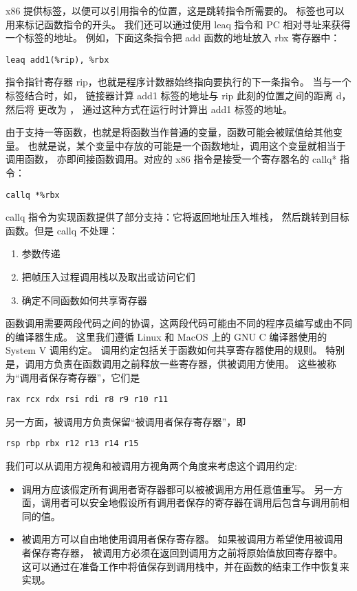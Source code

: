x86 提供标签，以便可以引用指令的位置，这是跳转指令所需要的。
标签也可以用来标记函数指令的开头。
我们还可以通过使用 leaq 指令和 PC 相对寻址来获得一个标签的地址。
例如，下面这条指令把 add 函数的地址放入 rbx 寄存器中：
\begin{lstlisting}
leaq add1(%rip), %rbx
\end{lstlisting}

指令指针寄存器 rip，也就是程序计数器始终指向要执行的下一条指令。
当与一个标签结合时，如，
链接器计算 add1 标签的地址与 rip 此刻的位置之间的距离 d，
然后将  更改为 ，
通过这种方式在运行时计算出 add1 标签的地址。

由于支持一等函数，也就是将函数当作普通的变量，函数可能会被赋值给其他变量。
也就是说，某个变量中存放的可能是一个函数地址，调用这个变量就相当于调用函数，
亦即间接函数调用。对应的 x86 指令是接受一个寄存器名的 callq* 指令：
\begin{lstlisting}
callq *%rbx
\end{lstlisting}

callq 指令为实现函数提供了部分支持：它将返回地址压入堆栈，
然后跳转到目标函数。但是 callq 不处理：
\begin{enumerate}
\item 参数传递
\item 把帧压入过程调用栈以及取出或访问它们
\item 确定不同函数如何共享寄存器
\end{enumerate}

函数调用需要两段代码之间的协调，这两段代码可能由不同的程序员编写或由不同的编译器生成。
这里我们遵循 Linux 和 MacOS 上的 GNU C 编译器使用的
System V 调用约定\cite{Matz_Hubicka_Jaeger_Mitchell_2013}。
调用约定包括关于函数如何共享寄存器使用的规则。
特别是，调用方负责在函数调用之前释放一些寄存器，供被调用方使用。
这些被称为“调用者保存寄存器”，它们是
\begin{lstlisting}
rax rcx rdx rsi rdi r8 r9 r10 r11
\end{lstlisting}
另一方面，被调用方负责保留“被调用者保存寄存器”，即
\begin{lstlisting}
rsp rbp rbx r12 r13 r14 r15
\end{lstlisting}

我们可以从调用方视角和被调用方视角两个角度来考虑这个调用约定:
\begin{itemize}
\item 调用方应该假定所有调用者寄存器都可以被被调用方用任意值重写。
另一方面，调用者可以安全地假设所有调用者保存的寄存器在调用后包含与调用前相同的值。
\item 被调用方可以自由地使用调用者保存寄存器。
如果被调用方希望使用被调用者保存寄存器，
被调用方必须在返回到调用方之前将原始值放回寄存器中。
这可以通过在准备工作中将值保存到调用栈中，并在函数的结束工作中恢复来实现。
\end{itemize}

